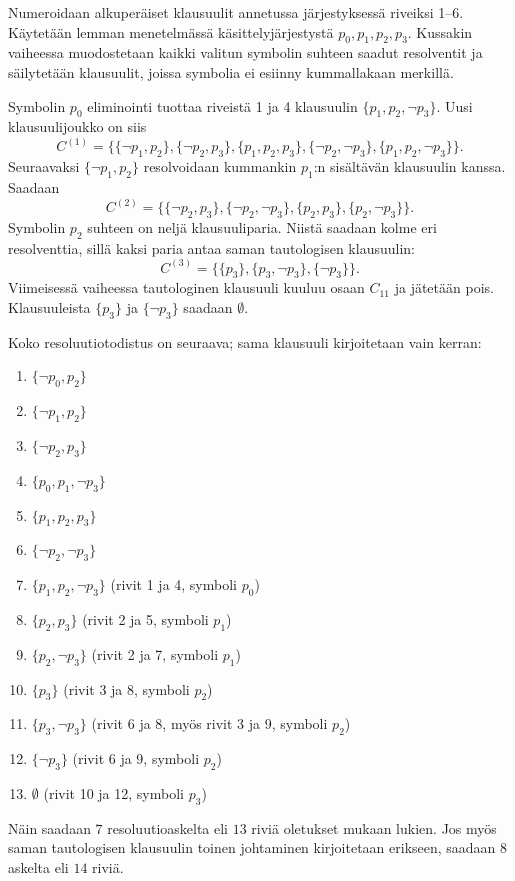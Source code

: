 \documentclass[11pt,a4paper]{amsart}
\begin{document}
\begin{solution}
Numeroidaan alkuperäiset klausuulit annetussa järjestyksessä riveiksi
1--6. Käytetään lemman menetelmässä käsittelyjärjestystä
\(p_0,p_1,p_2,p_3\). Kussakin vaiheessa muodostetaan kaikki valitun
symbolin suhteen saadut resolventit ja säilytetään klausuulit, joissa
symbolia ei esiinny kummallakaan merkillä.

Symbolin \(p_0\) eliminointi tuottaa riveistä 1 ja 4 klausuulin
\(\{p_1,p_2,\neg p_3\}\). Uusi klausuulijoukko on siis
\[
C^{(1)}=\bigl\{
\{\neg p_1,p_2\},\{\neg p_2,p_3\},\{p_1,p_2,p_3\},
\{\neg p_2,\neg p_3\},\{p_1,p_2,\neg p_3\}
\bigr\}.
\]
Seuraavaksi \(\{\neg p_1,p_2\}\) resolvoidaan kummankin
\(p_1\):n sisältävän klausuulin kanssa. Saadaan
\[
C^{(2)}=\bigl\{
\{\neg p_2,p_3\},\{\neg p_2,\neg p_3\},
\{p_2,p_3\},\{p_2,\neg p_3\}
\bigr\}.
\]
Symbolin \(p_2\) suhteen on neljä klausuuliparia. Niistä saadaan
kolme eri resolventtia, sillä kaksi paria antaa saman tautologisen
klausuulin:
\[
C^{(3)}=\bigl\{\{p_3\},\{p_3,\neg p_3\},\{\neg p_3\}\bigr\}.
\]
Viimeisessä vaiheessa tautologinen klausuuli kuuluu osaan \(C_{11}\)
ja jätetään pois. Klausuuleista \(\{p_3\}\) ja \(\{\neg p_3\}\)
saadaan \(\emptyset\).

Koko resoluutiotodistus on seuraava; sama klausuuli kirjoitetaan vain
kerran:
\begin{enumerate}[label=\arabic*., nosep]
\item \(\{\neg p_0,p_2\}\)
\item \(\{\neg p_1,p_2\}\)
\item \(\{\neg p_2,p_3\}\)
\item \(\{p_0,p_1,\neg p_3\}\)
\item \(\{p_1,p_2,p_3\}\)
\item \(\{\neg p_2,\neg p_3\}\)
\item \(\{p_1,p_2,\neg p_3\}\) (rivit 1 ja 4, symboli \(p_0\))
\item \(\{p_2,p_3\}\) (rivit 2 ja 5, symboli \(p_1\))
\item \(\{p_2,\neg p_3\}\) (rivit 2 ja 7, symboli \(p_1\))
\item \(\{p_3\}\) (rivit 3 ja 8, symboli \(p_2\))
\item \(\{p_3,\neg p_3\}\) (rivit 6 ja 8, myös rivit 3 ja 9,
symboli \(p_2\))
\item \(\{\neg p_3\}\) (rivit 6 ja 9, symboli \(p_2\))
\item \(\emptyset\) (rivit 10 ja 12, symboli \(p_3\))
\end{enumerate}
Näin saadaan \(7\) resoluutioaskelta eli \(13\) riviä oletukset mukaan
lukien. Jos myös saman tautologisen klausuulin toinen johtaminen
kirjoitetaan erikseen, saadaan \(8\) askelta eli \(14\) riviä.


\end{solution}
\end{document}
